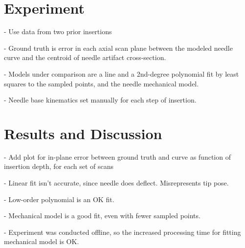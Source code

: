\section{Experiment}
- Use data from two prior insertions

- Ground truth is error in each axial scan plane between the modeled needle curve and the centroid of needle artifact cross-section.

- Models under comparison are a line and a 2nd-degree polynomial fit by least squares to the sampled points, and the needle mechanical model.

- Needle base kinematics set manually for each step of insertion.


\section{Results and Discussion}
- Add plot for in-plane error between ground truth and curve as function of insertion depth, for each set of scans

- Linear fit isn't accurate, since needle does deflect. Misrepresents tip pose.

- Low-order polynomial is an OK fit.

- Mechanical model is a good fit, even with fewer sampled points.

- Experiment was conducted offline, so the increased processing time for fitting mechanical model is OK.
